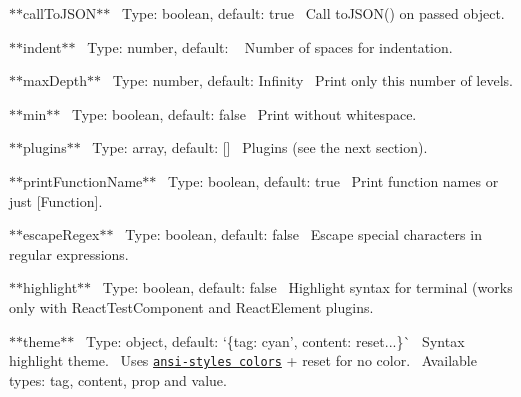\begin{DoxyItemize}
\item $\ast$$\ast${\ttfamily call\+To\+J\+S\+ON}$\ast$$\ast$~\newline
 Type\+: {\ttfamily boolean}, default\+: {\ttfamily true}~\newline
 Call {\ttfamily to\+J\+S\+O\+N()} on passed object.
\item $\ast$$\ast${\ttfamily indent}$\ast$$\ast$~\newline
 Type\+: {\ttfamily number}, default\+: {}~\newline
 Number of spaces for indentation.
\item $\ast$$\ast${\ttfamily max\+Depth}$\ast$$\ast$~\newline
 Type\+: {\ttfamily number}, default\+: {\ttfamily Infinity}~\newline
 Print only this number of levels.
\item $\ast$$\ast${\ttfamily min}$\ast$$\ast$~\newline
 Type\+: {\ttfamily boolean}, default\+: {\ttfamily false}~\newline
 Print without whitespace.
\item $\ast$$\ast${\ttfamily plugins}$\ast$$\ast$~\newline
 Type\+: {\ttfamily array}, default\+: {\ttfamily \mbox{[}\mbox{]}}~\newline
 Plugins (see the next section).
\item $\ast$$\ast${\ttfamily print\+Function\+Name}$\ast$$\ast$~\newline
 Type\+: {\ttfamily boolean}, default\+: {\ttfamily true}~\newline
 Print function names or just {\ttfamily \mbox{[}Function\mbox{]}}.
\item $\ast$$\ast${\ttfamily escape\+Regex}$\ast$$\ast$~\newline
 Type\+: {\ttfamily boolean}, default\+: {\ttfamily false}~\newline
 Escape special characters in regular expressions.
\item $\ast$$\ast${\ttfamily highlight}$\ast$$\ast$~\newline
 Type\+: {\ttfamily boolean}, default\+: {\ttfamily false}~\newline
 Highlight syntax for terminal (works only with {\ttfamily React\+Test\+Component} and {\ttfamily React\+Element} plugins.
\item $\ast$$\ast${\ttfamily theme}$\ast$$\ast$~\newline
 Type\+: {\ttfamily object}, default\+: `\{tag\+: \textquotesingle{}cyan', content\+: \textquotesingle{}reset\textquotesingle{}...\}\`{}~\newline
 Syntax highlight theme.~\newline
 Uses \href{https://github.com/chalk/ansi-styles#colors}{\tt ansi-\/styles colors} + {\ttfamily reset} for no color.~\newline
 Available types\+: {\ttfamily tag}, {\ttfamily content}, {\ttfamily prop} and {\ttfamily value}.
\end{DoxyItemize}

